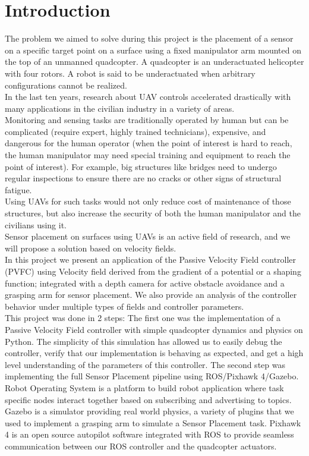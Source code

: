 \section{Introduction}
The problem we aimed to solve during this project is the placement of a sensor on a specific target point on a surface using a fixed manipulator arm mounted on the top of an unmanned quadcopter.
A quadcopter is an underactuated helicopter with four rotors. A robot is said to be underactuated when arbitrary configurations cannot be realized.\\
In the last ten years, research about UAV controls accelerated drastically with many applications in the civilian industry in a variety of areas.\\
Monitoring and sensing tasks are traditionally operated by human but can be complicated (require expert, highly trained technicians), expensive,  and dangerous for the human operator (when the point of interest is hard to reach, the human manipulator may need special training and equipment to reach the point of interest). For example, big structures like bridges need to undergo regular inspections to ensure there are no cracks or other signs of structural fatigue.\\
Using UAVs for such tasks would not only reduce cost of maintenance of those structures, but also increase the security of both the human manipulator and the civilians using it. \\
Sensor placement on surfaces using UAVs  is an active field of research, and we will propose a solution based on velocity fields.\\
In this project we present an application of the Passive Velocity Field controller (PVFC) using Velocity field derived from the gradient of a potential or a shaping function; integrated with a depth camera for active obstacle avoidance and a grasping arm for sensor placement. We also provide an analysis of the controller behavior under multiple types of fields and controller parameters.\\
This project was done in 2 steps: The first one was the implementation of a Passive Velocity Field controller with simple quadcopter dynamics and physics on Python. The simplicity of this simulation has allowed us to easily debug the controller, verify that our implementation is behaving as expected, and get a high level understanding of the parameters of this controller. 
The second step was implementing the full Sensor Placement pipeline using ROS/Pixhawk 4/Gazebo. Robot Operating System is a platform to build robot application where task specific nodes interact together based on subscribing and advertising to topics. Gazebo is a simulator providing real world physics, a variety of plugins that we used to implement a grasping arm to simulate a Sensor Placement task. Pixhawk 4 is an open source autopilot software integrated with ROS to provide seamless communication between our ROS controller and the quadcopter actuators.
